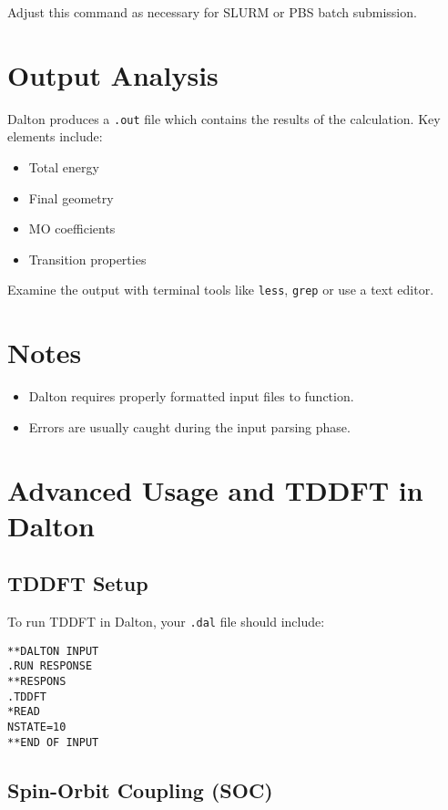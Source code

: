 Adjust this command as necessary for SLURM or PBS batch submission.

\section{Output Analysis}

Dalton produces a \texttt{.out} file which contains the results of the calculation. Key elements include:

\begin{itemize}
    \item Total energy
    \item Final geometry
    \item MO coefficients
    \item Transition properties
\end{itemize}

Examine the output with terminal tools like \texttt{less}, \texttt{grep} or use a text editor.

\section*{Notes}
\begin{itemize}
    \item Dalton requires properly formatted input files to function.
    \item Errors are usually caught during the input parsing phase.
\end{itemize}


\section*{Advanced Usage and TDDFT in Dalton}

\subsection*{TDDFT Setup}

To run TDDFT in Dalton, your \texttt{.dal} file should include:

\begin{verbatim}
**DALTON INPUT
.RUN RESPONSE
**RESPONS
.TDDFT
*READ
NSTATE=10
**END OF INPUT
\end{verbatim}

\subsection*{Spin-Orbit Coupling (SOC)}

